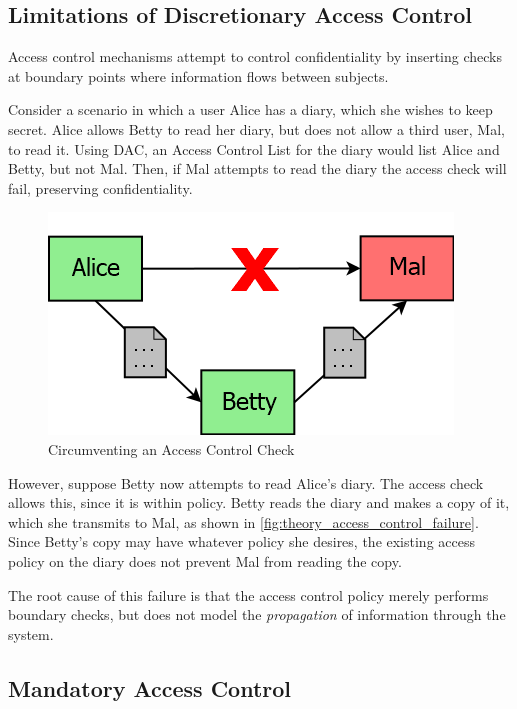 \subsection{Limitations of Discretionary Access Control} \label{theory_dac_limitations}

Access control mechanisms attempt to control confidentiality by inserting checks at boundary points where information flows between subjects.

Consider a scenario in which a user Alice has a diary, which she wishes to keep secret. Alice allows Betty to read her diary, but does not allow a third user, Mal, to read it. Using DAC, an Access Control List for the diary would list Alice and Betty, but not Mal. Then, if Mal attempts to read the diary the access check will fail, preserving confidentiality.

\begin{figure}[h!]
	\centering
	\includegraphics[scale=0.5]{content/lit_theory/access_control_example.png}
	\caption{Circumventing an Access Control Check}
	\label{fig:theory_access_control_failure}
\end{figure}

However, suppose Betty now attempts to read Alice's diary. The access check allows this, since it is within policy. Betty reads the diary and makes a copy of it, which she transmits to Mal, as shown in \autoref{fig:theory_access_control_failure}. Since Betty's copy may have whatever policy she desires, the existing access policy on the diary does not prevent Mal from reading the copy.

The root cause of this failure is that the access control policy merely performs boundary checks, but does not model the \textit{propagation} of information through the system.

\subsection{Mandatory Access Control} \label{accesscontrol_mac}

